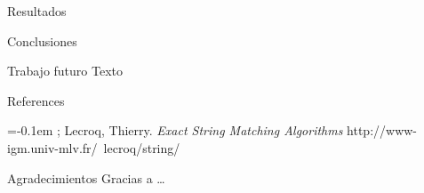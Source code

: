 \documentclass[a0paper, portrait]{baposter}
\begin{document}
\begin{poster}
  \begin{posterbox}[column=1, name=index, below=semantic]{Resultados} {
    
    }
  \end{posterbox}

  \begin{posterbox}[name=interact, column=2, row=0]{Conclusiones} {
    
  }
  \end{posterbox}

  
  \begin{posterbox}[column=2, name=future, below=interact] {Trabajo futuro} {
    Texto
  }
  \end{posterbox}
  
  \begin{posterbox}[column=2, name=ref, below=future] {References} {
      \small {
      \begin{flushleft}
        
        \renewcommand{\section}[2]{\vskip 0.05em}
        \begin{thebibliography}{7}\itemsep=-0.1em 
          \setlength{\baselineskip}{0.4em}
            ; {\sc Lecroq, Thierry}. {\it Exact String Matching Algorithms}  
            \newblock http://www-igm.univ-mlv.fr/~lecroq/string/      
        \end{thebibliography}
        \vspace{0.3em}       
      \end{flushleft}
      }
    }
  \end{posterbox}

  \begin{posterbox}[column=2, name=credits, below=ref] {Agradecimientos} {
      Gracias a \ldots
    }
  \end{posterbox}

\end{poster}
\end{document}
